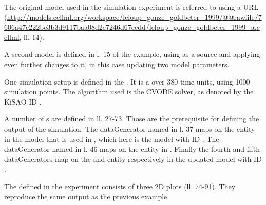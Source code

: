 The original model used in the simulation experiment is referred to using a URL (\url{http://models.cellml.org/workspace/leloup_gonze_goldbeter_1999/@@rawfile/7606a47e222bc3b3d9117baa08d2e7246d67eedd/leloup_gonze_goldbeter_1999_a.cellml}, ll. 14).

A second model is defined in l. 15 of the example, using  as a source and applying even further changes to it, in this case updating two model parameters.

One simulation setup is defined in the . It is a  over 380 time units, using 1000 simulation points. The algorithm used is the CVODE solver, as denoted by the KiSAO ID .

A number of s are defined in ll. 27-73. Those are the prerequisite for defining the output of the simulation. The dataGenerator named  in l. 37 maps on the  entity in the model that is used in , which here is the model with ID . The dataGenerator named  in l. 46 maps on the  entity in . Finally  the fourth and fifth dataGenerators map on the  and  entity respectively in the updated model with ID .

The  defined in the experiment consists of three 2D plots (ll. 74-91). They reproduce the same output as the previous example. 


